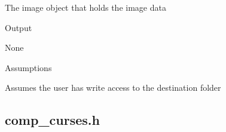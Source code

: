 \documentclass[pdftex, 11pt]{article}
\begin{document}
\begin{description}
\begin{description}
\begin{itemize}
						The image object that holds the
						image data

				\end{itemize}



			\item{Output}

				None

			\item{Assumptions}

				Assumes the user has write access to the
				destination folder

		\end{description}


\end{description}

\subsection{comp\_curses.h}
\end{document}
